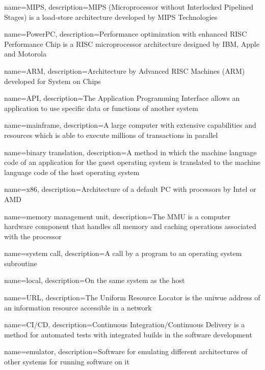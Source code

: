 {
    name={MIPS},
    description={MIPS (Microprocessor without Interlocked Pipelined Stages) is a load-store architecture developed by MIPS Technologies}
}

{
    name={PowerPC},
    description={Performance optimization with enhanced RISC Performance Chip is a RISC microprocessor architecture designed by IBM, Apple and Motorola}
}

{
    name={ARM},
    description={Architecture by Advanced RISC Machines (ARM) developed for System on Chips}
}

{
    name={API},
    description={The Application Programming Interface allows an application to use specific data or functions of another system}
}

{
    name={mainframe},
    description={A large computer with extensive capabilities and resources which is able to execute millions of transactions in parallel}
}

{
    name={binary translation},
    description={A method in which the machine language code of an application for the guest operating system is translated to the machine language code of the host operating system}
}

{
    name={x86},
    description={Architecture of a default PC with processors by Intel or AMD}
}

{
    name={memory management unit},
    description={The MMU is a computer hardware component that handles all memory and caching operations associated with the processor}
}

{
    name={system call},
    description={A call by a program to an operating system subroutine}
}

{
    name={local},
    description={On the same system as the host}
}

{
    name={URL},
    description={The Uniform Resource Locator is the uniwue address of an information resource accessible in a network}
}

{
    name={CI/CD},
    description={Continuous Integration/Continuous Delivery is a method for automated tests with integrated builds in the software development}
}

{
    name={emulator},
    description={Software for emulating different architectures of other systems for running software on it}
}

